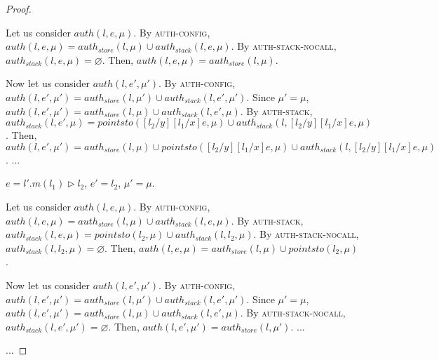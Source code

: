 \documentclass{llncs}
\newcommand{\pcase}[1][]{
  \if\relax\detokenize{#1}\relax
    \def\thiscase{}
  \else
    \def\thiscase{~#1}
  \fi
  \item
}
\begin{document}
\begin{proof}
\begin{pcases}
\hspace{12pt} Let us consider $auth(l, e, \mu)$. By \textsc{auth-config}, $auth(l, e, \mu) = auth_{store}(l, \mu) \cup auth_{stack}(l,e,\mu)$. By \textsc{auth-stack-nocall}, $auth_{stack}(l, e, \mu) = \varnothing$. Then, $auth(l, e, \mu) = auth_{store}(l, \mu)$.

\hspace{12pt} Now let us consider $auth(l, e', \mu')$. By \textsc{auth-config}, $auth(l, e', \mu') = auth_{store}(l, \mu') \cup auth_{stack}(l, e',\mu')$. Since $\mu' = \mu$, $auth(l, e', \mu') = auth_{store}(l, \mu) \cup auth_{stack}(l, e',\mu)$. By \textsc{auth-stack}, $auth_{stack}(l, e', \mu) = pointsto([l_2/y][l_1/x]e, \mu) \cup auth_{stack}(l, [l_2/y][l_1/x]e, \mu)$. Then, $auth(l, e', \mu') = auth_{store}(l, \mu) \cup pointsto([l_2/y][l_1/x]e, \mu) \cup auth_{stack}(l, [l_2/y][l_1/x]e, \mu)$.
...
\\
\pcase[\textsc{E-StackFrame}]
$e = l'.m(l_1) \rhd l_2$, $e' = l_2$, $\mu' = \mu$.

\hspace{12pt} Let us consider $auth(l, e, \mu)$. By \textsc{auth-config}, $auth(l, e, \mu) = auth_{store}(l, \mu) \cup auth_{stack}(l,e,\mu)$. By \textsc{auth-stack}, $auth_{stack}(l, e, \mu) = pointsto(l_2, \mu) \cup auth_{stack}(l, l_2, \mu)$. By \textsc{auth-stack-nocall}, $auth_{stack}(l, l_2, \mu) = \varnothing$. Then, $auth(l, e, \mu) = auth_{store}(l, \mu) \cup pointsto(l_2, \mu)$.

\hspace{12pt} Now let us consider $auth(l, e', \mu')$. By \textsc{auth-config}, $auth(l, e', \mu') = auth_{store}(l, \mu') \cup auth_{stack}(l, e',\mu')$. Since $\mu' = \mu$, $auth(l, e', \mu') = auth_{store}(l, \mu) \cup auth_{stack}(l, e',\mu)$. By \textsc{auth-stack-nocall}, $auth_{stack}(l, e', \mu') = \varnothing$. Then, $auth(l, e', \mu') = auth_{store}(l, \mu')$.
...
\\
\end{pcases}

\noindent...
\end{proof}

\fussy
\end{document}
